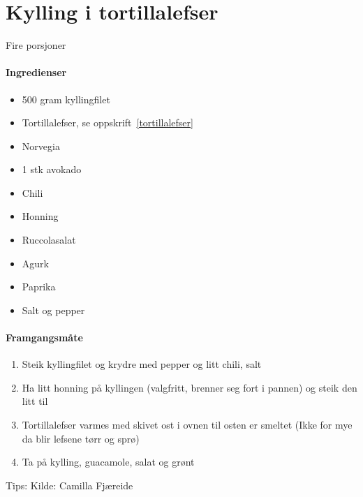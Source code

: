 \section{Kylling i tortillalefser}
\label{kyllingtortilla}

Fire porsjoner

\paragraph{Ingredienser}
\begin{itemize}[noitemsep]
	\item 500 gram kyllingfilet
		\item Tortillalefser, se oppskrift~\ref{tortillalefser}
		\item Norvegia
		\item 1 stk avokado
		\item Chili
		\item Honning
		\item Ruccolasalat
		\item Agurk
		\item Paprika
		\item Salt og pepper
\end{itemize}

\paragraph{Framgangsmåte}
\begin{enumerate}[noitemsep]
	\item Steik kyllingfilet og krydre med pepper og litt chili, salt
	\item Ha litt honning på kyllingen (valgfritt, brenner seg fort i pannen) og steik den litt til
	\item Tortillalefser varmes med skivet ost i ovnen til osten er smeltet (Ikke for mye da blir lefsene tørr og sprø)
	\item Ta på kylling, guacamole, salat og grønt
\end{enumerate}

Tips:
Kilde: Camilla Fjæreide
